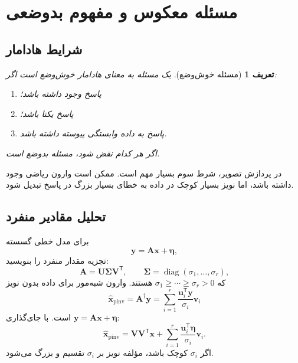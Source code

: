 \documentclass[12pt,openany,oneside]{book}
\newtheorem{definition}{تعریف}[chapter]
\newcommand{\trans}{^{\mathsf T}}
\newcommand{\vect}[1]{\bm{#1}}
\begin{document}
\section{مسئله معکوس و مفهوم بدوضعی}

\subsection{شرایط هادامار}

\begin{definition}[مسئله خوش‌وضع]
یک مسئله به معنای هادامار خوش‌وضع است اگر:
\begin{enumerate}
\item پاسخ وجود داشته باشد؛
\item پاسخ یکتا باشد؛
\item پاسخ به داده وابستگی پیوسته داشته باشد.
\end{enumerate}
اگر هر کدام نقض شود، مسئله بدوضع است.
\end{definition}

در پردازش تصویر، شرط سوم بسیار مهم است. ممکن است وارون ریاضی وجود داشته باشد، اما نویز بسیار کوچک در داده به خطای بسیار بزرگ در پاسخ تبدیل شود.

\subsection{تحلیل مقادیر منفرد}

برای مدل خطی گسسته
\begin{equation}
\vect y=\vect A\vect x+\vect\eta,
\end{equation}
تجزیه مقدار منفرد را بنویسید:
\begin{equation}
\vect A=\vect U\vect\Sigma\vect V\trans,
\qquad
\vect\Sigma=\operatorname{diag}(\sigma_1,\ldots,\sigma_r),
\end{equation}
که \(\sigma_1\ge\cdots\ge\sigma_r>0\) هستند. وارون شبه‌مور برای داده بدون نویز
\begin{equation}
\widehat{\vect x}_{\mathrm{pinv}}
=\vect A^\dagger\vect y
=\sum_{i=1}^{r}\frac{\vect u_i\trans\vect y}{\sigma_i}\vect v_i
\end{equation}
است. با جای‌گذاری \(\vect y=\vect A\vect x+\vect\eta\):
\begin{equation}
\widehat{\vect x}_{\mathrm{pinv}}
=\vect V\vect V\trans\vect x
+\sum_{i=1}^{r}\frac{\vect u_i\trans\vect\eta}{\sigma_i}\vect v_i.
\end{equation}
اگر \(\sigma_i\) کوچک باشد، مؤلفه نویز بر \(\sigma_i\) تقسیم و بزرگ می‌شود.
\end{document}
